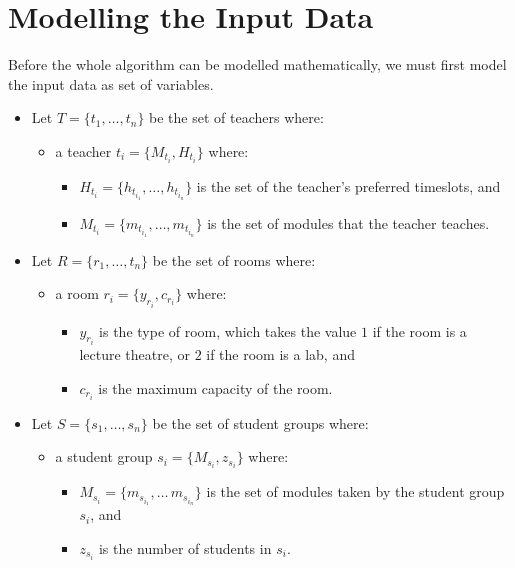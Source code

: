 \section{Modelling the Input Data}

Before the whole algorithm can be modelled mathematically, we must first model 
the input data as set of variables.
\begin{itemize}
	\item Let \( T = \{ t_1 , \ldots , t_n \} \) be the set of teachers where:
	\begin{itemize}
		\item a teacher \( t_i = \{ M_{t_i}, H_{t_i} \} \) where:
		\begin{itemize} 
			\item \( H_{t_i} = \{ h_{t_{i_1}} , \ldots , h_{t_{i_n}} \} \) is 
				the set of the teacher's preferred timeslots, and
			\item \( M_{t_i} = \{ m_{t_{i_1}} , \ldots , m_{t_{i_n}} \} \) is 
				the set of modules that the teacher teaches.
		\end{itemize}
	\end{itemize}
	\item Let \( R = \{ r_1 , \ldots , t_n \} \) be the set of rooms where:
	\begin{itemize}
		\item a room \( r_i = \{ y_{r_i} , c_{r_i} \} \) where:
		\begin{itemize}
			\item \( y_{r_i} \) is the type of room, which takes the value 
				\( 1 \) if the room is a lecture theatre, or \( 2 \) if the room
				is a lab, and
			\item \( c_{r_i} \) is the maximum capacity of the room.
		\end{itemize}
	\end{itemize}
	\item Let \( S = \{ s_1 , \ldots , s_n \} \) be the set of student groups
		where:
	\begin{itemize}
		\item a student group \( s_i = \{ M_{s_i} , z_{s_i} \} \) where:
		\begin{itemize}
			\item \( M_{s_i} = \{ m_{s_{i_1}} , \ldots \, m_{s_{i_n}} \} \) is 
				the set of modules taken by the student group \( s_i \), and
			\item \( z_{s_i} \) is the number of students in \( s_i \).
		\end{itemize} 
	\end{itemize}

\end{itemize}
